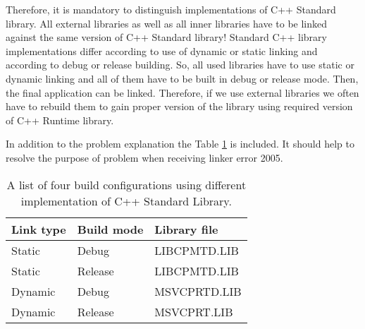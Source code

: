 Therefore, it is mandatory to distinguish implementations of C++ Standard library. All external libraries as well as all inner libraries have to be linked against the same version of C++ Standard library! Standard C++ library implementations differ according to use of dynamic or static linking and according to debug or release building. So, all used libraries have to use static or dynamic linking and all of them have to be built in debug or release mode. Then, the final application can be linked. Therefore, if we use external libraries we often have to rebuild them to gain proper version of the library using required version of C++ Runtime library.

In addition to the problem explanation the Table \ref{standardlibrarytable} is included. It should help to resolve the purpose of problem when receiving linker error 2005. 

\begin{table}
  \label{standardlibrarytable}
  \caption{A list of four build configurations using different implementation of C++ Standard Library.}
\begin{center}
	\begin{tabular}{| l| l | l |}
	  \hline                       
	  Link type & Build mode & Library file \\
	  \hline
	  \hline                     
	  Static & Debug & LIBCPMTD.LIB\\
	  \hline
	  Static & Release & LIBCPMTD.LIB\\
	  \hline  
	  Dynamic & Debug & MSVCPRTD.LIB\\
	  \hline  
	  Dynamic & Release & MSVCPRT.LIB\\  
	  \hline  
	\end{tabular}
\end{center}
\end{table}




